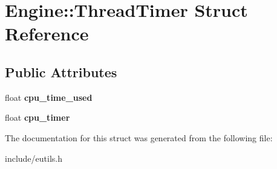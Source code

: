 \hypertarget{structEngine_1_1ThreadTimer}{}\section{Engine\+:\+:Thread\+Timer Struct Reference}
\label{structEngine_1_1ThreadTimer}
\subsection*{Public Attributes}
\begin{DoxyCompactItemize}
\item 
\hypertarget{structEngine_1_1ThreadTimer_ad7bb3de92f7332239b1d3d2c70938d86}{}float {\bfseries cpu\+\_\+time\+\_\+used}\label{structEngine_1_1ThreadTimer_ad7bb3de92f7332239b1d3d2c70938d86}

\item 
\hypertarget{structEngine_1_1ThreadTimer_a74a1292dced6b3e6792e4bdcf5e0d88e}{}float {\bfseries cpu\+\_\+timer}\label{structEngine_1_1ThreadTimer_a74a1292dced6b3e6792e4bdcf5e0d88e}

\end{DoxyCompactItemize}


The documentation for this struct was generated from the following file\+:\begin{DoxyCompactItemize}
\item 
include/eutils.\+h\end{DoxyCompactItemize}
